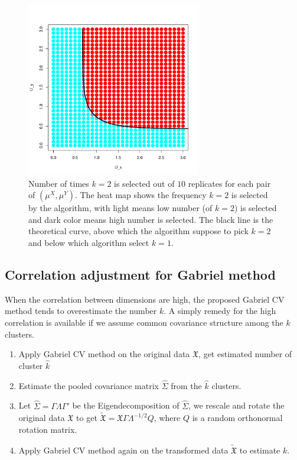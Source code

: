 \documentclass[12pt]{article}
\newcommand{\muX}{\mu^{X}}
\newcommand{\muY}{\mu^{Y}}
\newcommand{\dataX}{\mathfrak{X}}
\begin{document}
\begin{figure}[H]
\centering
\includegraphics[width=3in]{demo/overlap/color_plot.pdf}
\caption{Number of times $k=2$ is selected out of $10$ replicates for each pair of $(\muX, \muY)$. The heat map shows the frequency $k=2$ is selected by the algorithm, with light means low number (of $k=2$) is selected and dark color means high number is selected. The black line is the theoretical curve, above which the algorithm suppose to pick $k=2$ and below which algorithm select $k=1$.  }
\label{fig:overlap-color_plot}
\end{figure}

\subsection{Correlation adjustment for Gabriel method}
When the correlation between dimensions are high, the proposed Gabriel CV method tends to overestimate the number $k$. A simply remedy for the high correlation is available if we assume common covariance structure among the $k$ clusters. 
\begin{enumerate}
	\item Apply Gabriel CV method on the original data $\dataX$, get estimated number of cluster $\hat{k}$
	\item Estimate the pooled covariance matrix $\hat{\Sigma}$ from the $\hat{k}$ clusters.
	\item Let $\hat{\Sigma} = \Gamma\Lambda\Gamma'$ be the Eigendecomposition of $\hat{\Sigma}$, we rescale and rotate the original data $\dataX$ to get $ \widetilde{\dataX} = \dataX\Gamma\Lambda^{-1/2}Q$, where $Q$ is a random  orthonormal rotation matrix. 
	\item Apply Gabriel CV method again on the transformed data $ \widetilde{\dataX}$ to estimate $k$. 
\end{enumerate}
 
\end{document}
